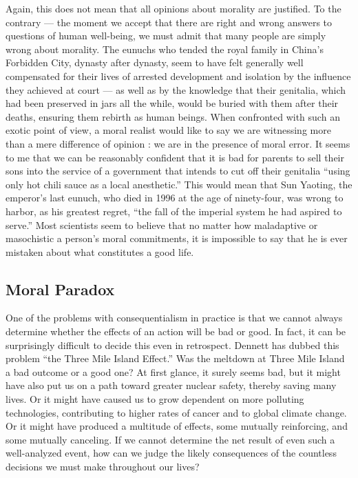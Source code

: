 \documentclass[a4paper,14pt]{extbook}
\begin{document}
Again, this does not mean that all opinions about morality are justified.
To the contrary --- the moment we accept that there are right and wrong answers to questions of human well-being, we must admit that many people are simply wrong about morality.
The eunuchs who tended the royal family in China's Forbidden City, dynasty after dynasty, seem to have felt generally well compensated for their lives of arrested development and isolation by the influence they achieved at court --- as well as by the knowledge that their genitalia, which had been preserved in jars all the while, would be buried with them after their deaths, ensuring them rebirth as human beings.
When confronted with such an exotic point of view, a moral realist would like to say we are witnessing more than a mere difference of opinion :
we are in the presence of moral error.
It seems to me that we can be reasonably confident that it is bad for parents to sell their sons into the service of a government that intends to cut off their genitalia ``using only hot chili sauce as a local anesthetic.''
This would mean that Sun Yaoting, the emperor's last eunuch, who died in 1996 at the age of ninety-four, was wrong to harbor, as his greatest regret, ``the fall of the imperial system he had aspired to serve.''
Most scientists seem to believe that no matter how maladaptive or masochistic a person's moral commitments, it is impossible to say that he is ever mistaken about what constitutes a good life.

\subsection{Moral Paradox}

One of the problems with consequentialism in practice is that we cannot always determine whether the effects of an action will be bad or good.
In fact, it can be surprisingly difficult to decide this even in retrospect.
Dennett has dubbed this problem ``the Three Mile Island Effect.''
Was the meltdown at Three Mile Island a bad outcome or a good one?
At first glance, it surely seems bad, but it might have also put us on a path toward greater nuclear safety, thereby saving many lives.
Or it might have caused us to grow dependent on more polluting technologies, contributing to higher rates of cancer and to global climate change.
Or it might have produced a multitude of effects, some mutually reinforcing, and some mutually canceling.
If we cannot determine the net result of even such a well-analyzed event, how can we judge the likely consequences of the countless decisions we must make throughout our lives?
\end{document}
